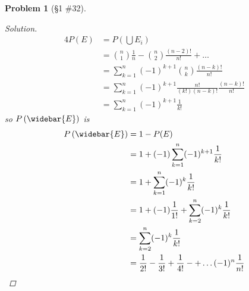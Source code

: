 \documentclass[11pt, oneside]{book}   	%
\newtheorem{problem}{Problem}
\begin{document}
\begin{problem}[\S 1 \#32]
\begin{proof}[Solution]
		\begin{alignat*}{4}
			P(E)&=P\left(\bigcup E_i\right) \\
				&=\binom{n}{1}\frac{1}{n}-\binom{n}{2}\frac{(n-2)!}{n!}+\dots \\
				&=\sum_{k=1}^n (-1)^{k+1}\binom{n}{k}\frac{(n-k)!}{n!} \\
				&=\sum_{k=1}^n(-1)^{k+1} \frac{n!}{(k!)(n-k)!}\frac{(n-k)!}{n!} \\
				&=\sum_{k=1}^n(-1)^{k+1}\frac{1}{k!}
		\end{alignat*}
		so $P\left(\widebar{E}\right)$ is 
		\begin{alignat*}{4}
			P\left(\widebar{E}\right)&=1-P(E) \\
				&=1+(-1)\sum_{k=1}^n(-1)^{k+1}\frac{1}{k!} \\
				&=1+\sum_{k=1}^n(-1)^k\frac{1}{k!} \\
				&=1+(-1)\frac{1}{1!}+\sum_{k=2}^n(-1)^k\frac{1}{k!} \\
				&=\sum_{k=2}^n(-1)^k\frac{1}{k!} \\
				&=\frac{1}{2!}-\frac{1}{3!}+\frac{1}{4!} -+ \dots (-1)^n\frac{1}{n!}
		\end{alignat*}
	\end{proof}
\end{problem}
\end{document}

